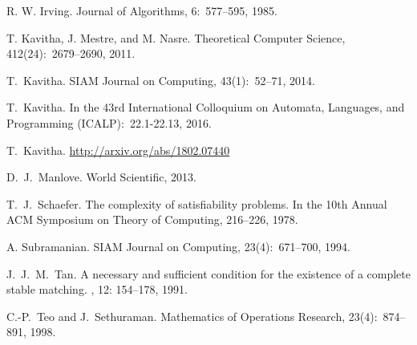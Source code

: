 \documentclass{llncs}
\begin{document}
\begin{thebibliography}{22}
R. W. Irving.
\newblock Journal of Algorithms, 6:~577--595, 1985. 

T. Kavitha, J. Mestre, and M. Nasre.
\newblock Theoretical Computer Science, 412(24):~2679--2690, 2011.

T.~Kavitha.
\newblock SIAM Journal on Computing, 43(1):~52--71, 2014.

T.~Kavitha.
\newblock In the 43rd International Colloquium on Automata, Languages, and Programming (ICALP):~22.1-22.13, 2016.


  T.~Kavitha.
  \newblock \url{http://arxiv.org/abs/1802.07440}

  D.~J.~Manlove.
  \newblock World Scientific, 2013.
  
  T.~J.~Schaefer.
\newblock The complexity of satisfiability problems.
\newblock In the 10th Annual ACM Symposium on Theory of Computing, 216--226, 1978.
  
  A. Subramanian.
\newblock SIAM Journal on Computing, 23(4):~671--700, 1994.

J.~J.~M.~Tan.
\newblock A necessary and sufficient condition for the existence of a
complete stable matching.
, 12: 154--178, 1991.

C.-P.~Teo and J.~Sethuraman.
\newblock Mathematics of Operations Research, 23(4):~874--891, 1998.
\end{thebibliography}
\end{document}
